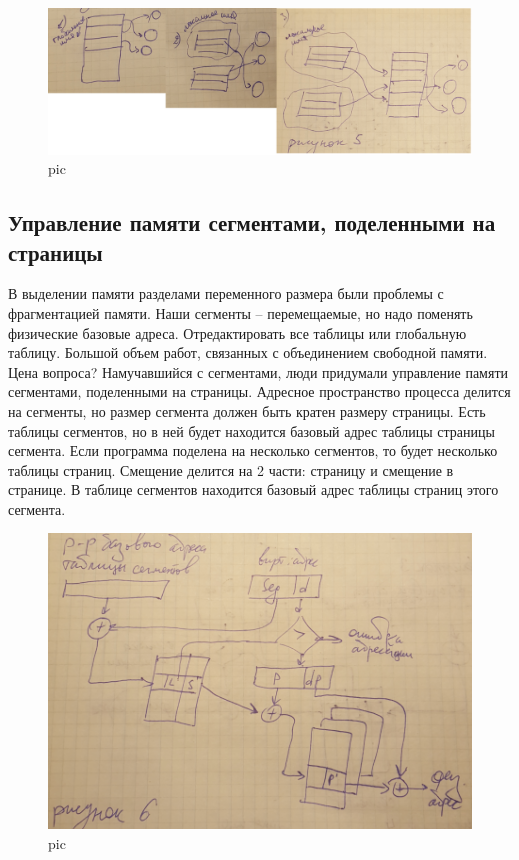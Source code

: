 \begin{figure}[H]
    \centering
    \includegraphics[width=\textwidth]{pic/5.png}
    \caption{pic}
\end{figure}

\subsection{Управление памяти сегментами, поделенными на страницы}

В выделении памяти разделами переменного размера были проблемы с фрагментацией памяти. Наши сегменты – перемещаемые, но надо поменять физические базовые адреса. Отредактировать все таблицы или глобальную таблицу.  Большой объем работ, связанных с объединением свободной памяти. Цена вопроса? Намучавшийся с сегментами, люди придумали управление памяти сегментами, поделенными на страницы. Адресное пространство процесса делится на сегменты, но размер сегмента должен быть кратен размеру страницы. Есть таблицы сегментов, но в ней будет находится базовый адрес таблицы страницы сегмента. Если программа поделена на несколько сегментов, то будет несколько таблицы страниц. Смещение делится на 2 части: страницу и смещение в странице. В таблице сегментов находится базовый адрес таблицы страниц этого сегмента.

\begin{figure}[H]
    \centering
    \includegraphics[width=\textwidth]{pic/6.png}
    \caption{pic}
\end{figure}

